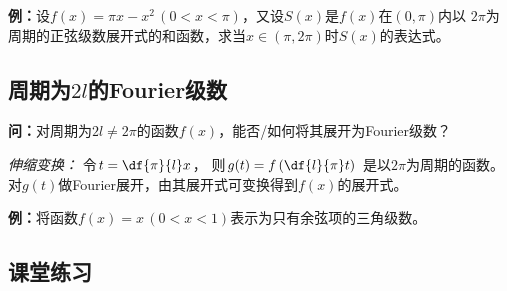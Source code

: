 \begin{center}
	
\end{center}

{\bf 例：}设$f(x)=\pi x-x^2\,(0<x<\pi)$，又设$S(x)$是$f(x)$在$(0,\pi)$内以
$2\pi$为周期的正弦级数展开式的和函数，求当$x\in(\pi,2\pi)$时$S(x)$的表达式。

\subsection{周期为$2l$的Fourier级数}

{\bf 问：}对周期为$2l\ne2\pi$的函数$f(x)$，能否/如何将其展开为Fourier级数？

{\it 伸缩变换：} 令$t=\df{\pi}{l}x$，
则$g(t)=f\left(\df{l}{\pi}t\right)$ 是以$2\pi$为周期的函数。 
对$g(t)$做Fourier展开，由其展开式可变换得到$f(x)$的展开式。

{\bf 例：}将函数$f(x)=x\,(0<x<1)$表示为只有余弦项的三角级数。

\subsection{课堂练习}

